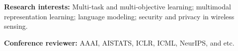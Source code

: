 \textbf{Research interests:} Multi-task and multi-objective learning; multimodal
representation learning; language modeling; security and privacy in wireless sensing.\par
\textbf{Conference reviewer:} AAAI, AISTATS, ICLR, ICML, NeurIPS, and etc.
